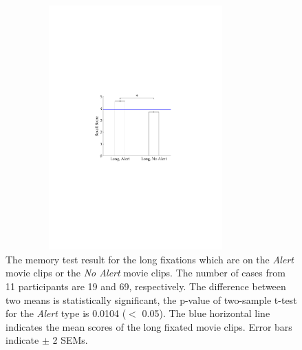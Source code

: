 \documentclass[oneside,master]{snueethesis}
\begin{document}
\begin{figure}
  \centerline{\includegraphics[width=100mm,height=94mm,trim=48mm 100mm 52mm 95mm]{./eps/memtest_long.pdf}}
  \caption[The memory test result for the long fixations which are on Alert movie clips or No Alert movie clips]{The memory test result for the long fixations which are on the \textit{Alert} movie clips or the \textit{No Alert} movie clips. The number of cases from 11 participants are 19 and 69, respectively. The difference between two means is statistically significant, the p-value of two-sample t-test for the \textit{Alert} type is 0.0104 ($<$ 0.05). The blue horizontal line indicates the mean scores of the long fixated movie clips. Error bars indicate $\pm$ 2 SEMs.}
  \label{fig:memtest-long}
\end{figure}
\end{document}

